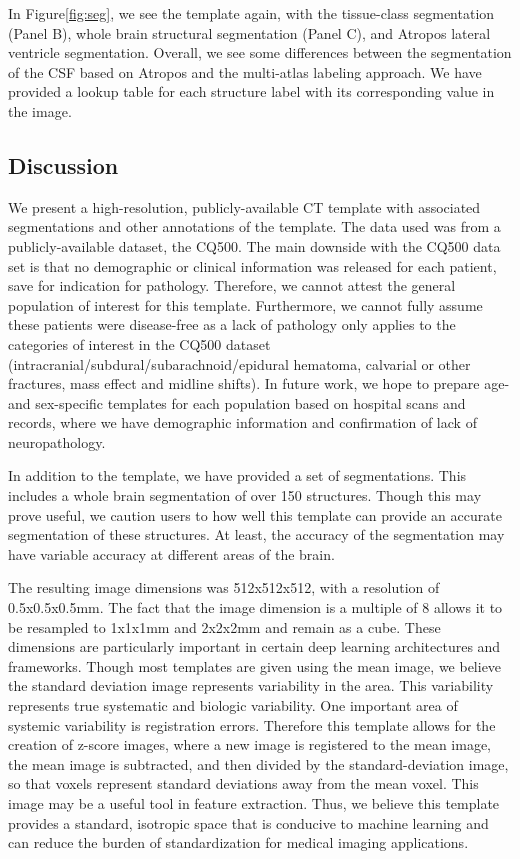 \documentclass[]{elsarticle} %
\begin{document}
In Figure\ref{fig:seg}, we see the template again, with the tissue-class segmentation (Panel B), whole brain structural segmentation (Panel C), and Atropos lateral ventricle segmentation. Overall, we see some differences between the segmentation of the CSF based on Atropos and the multi-atlas labeling approach. We have provided a lookup table for each structure label with its corresponding value in the image.

\hypertarget{discussion}{%
\subsection{Discussion}\label{discussion}}

We present a high-resolution, publicly-available CT template with associated segmentations and other annotations of the template. The data used was from a publicly-available dataset, the CQ500. The main downside with the CQ500 data set is that no demographic or clinical information was released for each patient, save for indication for pathology. Therefore, we cannot attest the general population of interest for this template. Furthermore, we cannot fully assume these patients were disease-free as a lack of pathology only applies to the categories of interest in the CQ500 dataset (intracranial/subdural/subarachnoid/epidural hematoma, calvarial or other fractures, mass effect and midline shifts). In future work, we hope to prepare age- and sex-specific templates for each population based on hospital scans and records, where we have demographic information and confirmation of lack of neuropathology.

In addition to the template, we have provided a set of segmentations. This includes a whole brain segmentation of over 150 structures. Though this may prove useful, we caution users to how well this template can provide an accurate segmentation of these structures. At least, the accuracy of the segmentation may have variable accuracy at different areas of the brain.

The resulting image dimensions was 512x512x512, with a resolution of 0.5x0.5x0.5mm. The fact that the image dimension is a multiple of 8 allows it to be resampled to 1x1x1mm and 2x2x2mm and remain as a cube. These dimensions are particularly important in certain deep learning architectures and frameworks. Though most templates are given using the mean image, we believe the standard deviation image represents variability in the area. This variability represents true systematic and biologic variability. One important area of systemic variability is registration errors. Therefore this template allows for the creation of z-score images, where a new image is registered to the mean image, the mean image is subtracted, and then divided by the standard-deviation image, so that voxels represent standard deviations away from the mean voxel. This image may be a useful tool in feature extraction. Thus, we believe this template provides a standard, isotropic space that is conducive to machine learning and can reduce the burden of standardization for medical imaging applications.
\end{document}
